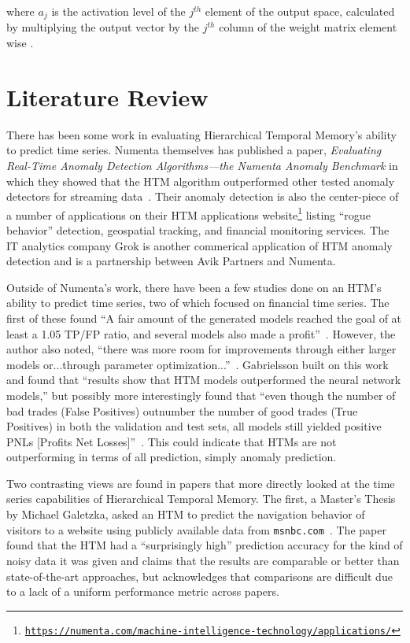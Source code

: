 \documentclass[oneside,12pt,openany]{book}
\begin{document}
	
	 \noindent where $a_{j}$ is the activation level of the $j^{th}$ element of the output space, calculated by multiplying the output vector by the $j^{th}$ column of the weight matrix element wise \cite{Dillon}. 
	
	\chapter{Literature Review}
	
	
	There has been some work in evaluating Hierarchical Temporal Memory's ability to predict time series. Numenta themselves has published a paper, \textit{Evaluating Real-Time Anomaly Detection Algorithms---the Numenta Anomaly Benchmark} in which they showed that the HTM algorithm outperformed other tested anomaly detectors for streaming data~\cite{NAB}. Their anomaly detection is also the center-piece of a number of applications on their HTM applications website\footnote{\href{https://numenta.com/machine-intelligence-technology/applications/}{\texttt{https://numenta.com/machine-intelligence-technology/applications/}}} listing ``rogue behavior'' detection, geospatial tracking, and financial monitoring services. The IT analytics company Grok is another commerical application of HTM anomaly detection and is a partnership between Avik Partners and Numenta.
	
	Outside of Numenta's work, there have been a few studies done on an HTM's ability to predict time series, two of which focused on financial time series. The first of these found ``A fair amount of the generated models reached the goal of at least a 1.05 TP/FP ratio, and several models also made a profit''~\cite{Evaluation}. However, the author also noted, ``there was more room for improvements through either larger models or...through parameter optimization...''~\cite{Evaluation}. Gabrielsson built on this work and found that ``results show that HTM models outperformed the neural network models,'' but possibly more interestingly found that ``even though the number of bad trades (False Positives) outnumber the number of good trades (True Positives) in both the validation and test sets, all models still yielded positive PNLs [Profits Net Losses]''~\cite{EvolvingTrading}. This could indicate that HTMs are not outperforming in terms of all prediction, simply anomaly prediction.
	
	Two contrasting views are found in papers that more directly looked at the time series capabilities of Hierarchical Temporal Memory. The first, a Master's Thesis by Michael Galetzka, asked an HTM to predict the navigation behavior of visitors to a website using publicly available data from \texttt{msnbc.com}~\cite{Galetzka}. The paper found that the HTM had a ``surprisingly high'' prediction accuracy for the kind of noisy data it was given and claims that the results are comparable or better than state-of-the-art approaches, but acknowledges that comparisons are difficult due to a lack of a uniform performance metric across papers.
	
\end{document}
